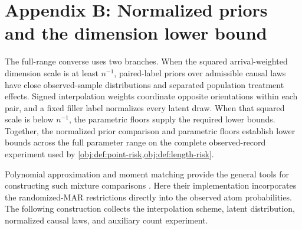 \section{Appendix B: Normalized priors and the dimension lower bound}

The full-range converse uses two branches. When the squared arrival-weighted dimension scale is at least \(n^{-1}\), paired-label priors over admissible causal laws have close observed-sample distributions and separated population treatment effects. Signed interpolation weights coordinate opposite orientations within each pair, and a fixed filler label normalizes every latent draw. When that squared scale is below \(n^{-1}\), the parametric floors supply the required lower bounds. Together, the normalized prior comparison and parametric floors establish lower bounds across the full parameter range on the complete observed-record experiment used by \cref{obj:def:point-risk,obj:def:length-risk}.

Polynomial approximation and moment matching provide the general tools for constructing such mixture comparisons \citep{WuYang2016,Wu2020}. Here their implementation incorporates the randomized-MAR restrictions directly into the observed atom probabilities. The following construction collects the interpolation scheme, latent distribution, normalized causal laws, and auxiliary count experiment.

